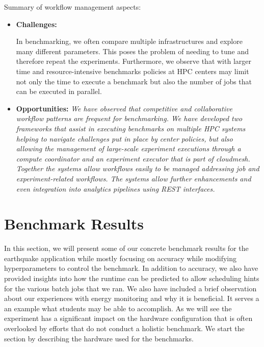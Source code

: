 \documentclass[utf8]{FrontiersinVancouver} %
\begin{document}
\begin{tcolorbox}
Summary of workflow management aspects:

\begin{itemize}

\item {\bf Challenges:} {\it 

In benchmarking, we often compare multiple infrastructures and explore many different parameters. This poses the problem of needing to tune and therefore repeat the experiments. Furthermore, we observe that with larger time and resource-intensive benchmarks policies at HPC centers may limit not only the time to execute a benchmark but also the number of jobs that can be executed in parallel.
}


\item {\bf Opportunities:} {\it We have observed that competitive and collaborative workflow patterns are frequent for benchmarking. We have developed two frameworks that assist in executing benchmarks on multiple HPC systems helping to navigate challenges put in place by center policies, but also allowing the management of large-scale experiment executions through a compute coordinator and an experiment executor that is part of cloudmesh. Together the systems allow workflows easily to be managed addressing job and experiment-related workflows. The systems allow further enhancements and even integration into analytics pipelines using REST interfaces.}

\end{itemize}
\end{tcolorbox}
  


\section{Benchmark Results}
\label{sec:results}

In this section, we will present some of our concrete benchmark results for the earthquake application while mostly focusing on accuracy while modifying hyperparameters to control the benchmark. In addition to accuracy, we also have provided insights into how the runtime can be predicted to allow scheduling hints for the various batch jobs that we ran. We also have included a brief observation about our experiences with energy monitoring and why it is beneficial. 
It serves a an example what students may be able to accomplish. As we will see the experiment has a significant impact on the hardware configuration that is often overlooked by efforts that do not conduct a holistic benchmark.
We start the section by describing the hardware used for the benchmarks.
\end{document}
